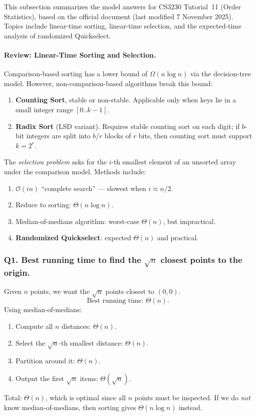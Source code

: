 \documentclass[9pt]{extarticle}
\begin{document}
This subsection summarizes the model answers for CS3230 Tutorial~11 (Order
Statistics), based on the official document (last modified 7 November 2025).
Topics include linear-time sorting, linear-time selection, and the expected-time
analysis of randomized Quickselect.

\paragraph{Review: Linear-Time Sorting and Selection.}
Comparison-based sorting has a lower bound of $\Omega(n \log n)$ via the
decision-tree model.  However, non-comparison-based algorithms break this bound:
\begin{enumerate}
    \item \textbf{Counting Sort}, stable or non-stable.  
          Applicable only when keys lie in a small integer range $[0..k-1]$.
    \item \textbf{Radix Sort} (LSD variant).  
          Requires stable counting sort on each digit; if $b$-bit integers are
          split into $b/r$ blocks of $r$ bits, then counting sort must support
          $k = 2^r$.
\end{enumerate}

The \emph{selection problem} asks for the $i$-th smallest element of an
unsorted array under the comparison model.  Methods include:
\begin{enumerate}
    \item $\mathcal{O}(i n)$ “complete search” --- slowest when $i \approx n/2$.
    \item Reduce to sorting: $\Theta(n \log n)$.
    \item Median-of-medians algorithm: worst-case $\Theta(n)$, but impractical.
    \item \textbf{Randomized Quickselect}: expected $\Theta(n)$ and practical.
\end{enumerate}

\subsubsection*{Q1. Best running time to find the $\sqrt{n}$ closest points to the origin.}

Given $n$ points, we want the $\sqrt{n}$ points closest to $(0,0)$.
\[
\text{Best running time: } \Theta(n).
\]
Using median-of-medians:
\begin{enumerate}
    \item Compute all $n$ distances: $\Theta(n)$.
    \item Select the $\sqrt{n}$-th smallest distance: $\Theta(n)$.
    \item Partition around it: $\Theta(n)$.
    \item Output the first $\sqrt{n}$ items: $\Theta(\sqrt{n})$.
\end{enumerate}
Total: $\Theta(n)$, which is optimal since all $n$ points must be inspected.
If we do \emph{not} know median-of-medians, then sorting gives
$\Theta(n \log n)$ instead.
\end{document}
